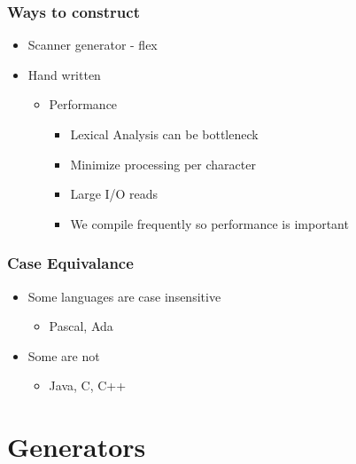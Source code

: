\documentclass[usepdftitle=false,professionalfonts,compress ]{beamer}
\begin{document}
{
\begin{frame}\frametitle{Ways to construct}

	\begin{itemize}
	\item Scanner generator - flex
			\item Hand written

	\begin{itemize}
	\item Performance

	\begin{itemize}
	\item Lexical Analysis can be bottleneck
			\item Minimize processing per character
			\item Large I/O reads
			\item We compile frequently so performance is important
				\end{itemize}

				\end{itemize}

				\end{itemize}

\end{frame}}




{
\begin{frame}\frametitle{Case Equivalance}

	\begin{itemize}
	\item Some languages are case insensitive

	\begin{itemize}
	\item Pascal, Ada
				\end{itemize}

			\item Some are not

	\begin{itemize}
	\item Java, C, C++
				\end{itemize}

				\end{itemize}

\end{frame}}





\section{Generators}
		
\end{document}
